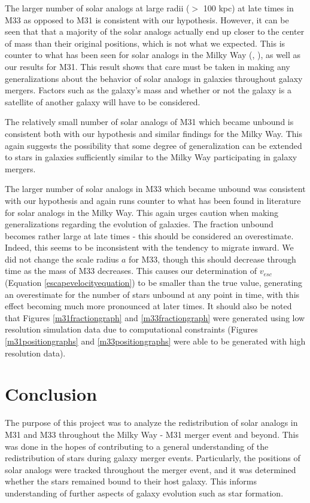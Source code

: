 \documentclass{aastex63}
\begin{document}
The larger number of solar analogs at large radii ($>$ 100 kpc) at late times in M33 as opposed to M31 is consistent with our hypothesis. However, it can be seen that that a majority of the solar analogs actually end up closer to the center of mass than their original positions, which is not what we expected. This is counter to what has been seen for solar analogs in the Milky Way (\cite{cox08}, \cite{van12}), as well as our results for M31. This result shows that care must be taken in making any generalizations about the behavior of solar analogs in galaxies throughout galaxy mergers. Factors such as the galaxy's mass and whether or not the galaxy is a satellite of another galaxy will have to be considered. 

The relatively small number of solar analogs of M31 which became unbound is consistent both with our hypothesis and similar findings for the Milky Way. This again suggests the possibility that some degree of generalization can be extended to stars in galaxies sufficiently similar to the Milky Way participating in galaxy mergers. 

The larger number of solar analogs in M33 which became unbound was consistent with our hypothesis and again runs counter to what has been found in literature for solar analogs in the Milky Way. This again urges caution when making generalizations regarding the evolution of galaxies. The fraction unbound becomes rather large at late times - this should be considered an overestimate. Indeed, this seems to be inconsistent with the tendency to migrate inward. We did not change the scale radius $a$ for M33, though this should decrease through time as the mass of M33 decreases. This causes our determination of $v_{esc}$ (Equation \ref{escapevelocityequation}) to be smaller than the true value, generating an overestimate for the number of stars unbound at any point in time, with this effect becoming much more pronounced at later times. It should also be noted that Figures \ref{m31fractiongraph} and \ref{m33fractiongraph} were generated using low resolution simulation data due to computational constraints (Figures \ref{m31positiongraphs} and \ref{m33positiongraphs} were able to be generated with high resolution data). 



\section{Conclusion}

The purpose of this project was to analyze the redistribution of solar analogs in M31 and M33 throughout the Milky Way - M31 merger event and beyond. This was done in the hopes of contributing to a general understanding of the redistribution of stars during galaxy merger events. Particularly, the positions of solar analogs were tracked throughout the merger event, and it was determined whether the stars remained bound to their host galaxy. This informs understanding of further aspects of galaxy evolution such as star formation. 
\end{document}
